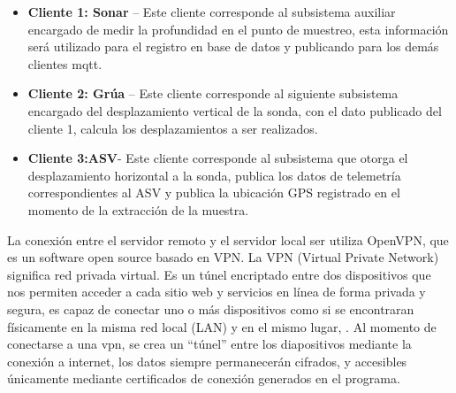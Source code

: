 \begin{itemize}
    \item \textbf{Cliente 1: Sonar} – Este cliente corresponde al subsistema auxiliar encargado de medir la profundidad en el punto de muestreo,  esta informaci\'on ser\'a utilizado para el registro en base de datos y publicando para los dem\'as clientes mqtt.
    \item \textbf{Cliente 2: Gr\'ua} – Este cliente corresponde al siguiente subsistema encargado del desplazamiento vertical de la sonda, con el dato publicado del cliente 1, calcula los desplazamientos a ser realizados.
    \item \textbf{Cliente 3:ASV}- Este cliente corresponde al subsistema que otorga el desplazamiento horizontal a la sonda, publica los datos de telemetr\'ia correspondientes al ASV y publica la ubicaci\'on GPS registrado en el momento de la extracci\'on de la muestra.
\end{itemize}

La conexi\'on entre el servidor remoto y el servidor local ser utiliza OpenVPN, que es un software open source basado en VPN. La VPN (Virtual Private Network) significa red privada virtual. Es un t\'unel encriptado entre dos dispositivos que nos permiten acceder a cada sitio web y servicios en línea de forma privada y segura, es capaz de conectar uno o más dispositivos como si se encontraran físicamente en la misma red local (LAN) y en el mismo lugar, \cite{arora_131_nodate}. Al momento de conectarse a una vpn, se crea un “túnel” entre los diapositivos mediante la conexi\'on a internet, los datos siempre permanecerán cifrados, y accesibles \'unicamente mediante certificados de conexi\'on generados en el programa. 

